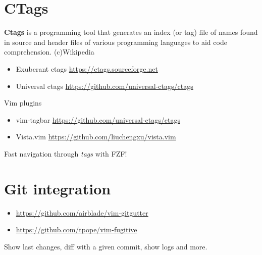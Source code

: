 \documentclass[aspectratio=169]{beamer}
\begin{document}
\section*{CTags}
\begin{frame}{\secname}
  \textbf{Ctags} is a programming tool that generates an index (or tag) file of names found in source and header files of various programming languages to aid code comprehension. (c)Wikipedia
  \begin{itemize}

    \item Exuberant ctags \url{https://ctags.sourceforge.net}
    \item Universal ctags \url{https://github.com/universal-ctags/ctags}

  \end{itemize}

  \begin{block}{Vim plugins}
    \begin{itemize}
      \item vim-tagbar \url{https://github.com/universal-ctags/ctags}
      \item Vista.vim \url{https://github.com/liuchengxu/vista.vim}
    \end{itemize} 
  \end{block}
  Fast navigation through \textit{tags} with FZF!
  	
\end{frame}

\section*{Git integration}
\begin{frame}{\secname}
  \begin{itemize}
    \item \url{https://github.com/airblade/vim-gitgutter}
    \item \url{https://github.com/tpope/vim-fugitive}
  \end{itemize}
  Show last changes, diff with a given commit, show logs and more.
    
\end{frame}


\end{document}
